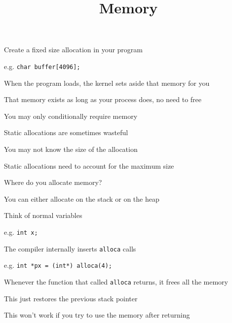 

\title{Memory}



\begin{frame}
    \titlepage
\end{frame}

\begin{slide}


    Create a fixed size allocation in your program

    \leftspace{}e.g. \texttt{char buffer[4096];}
    \medskip

    When the program loads, the kernel sets aside that memory
    for you
    \medskip

    That memory exists as long as your process does, no need to free

\end{slide}

\begin{slide}


    You may only conditionally require memory

    \leftspace{}Static allocations are sometimes wasteful
    \medskip

    You may not know the size of the allocation

    \leftspace{}Static allocations need to account for the maximum size
    \medskip

    Where do you allocate memory?

    \leftspace{}You can either allocate on the stack or on the heap

\end{slide}

\begin{slide}


    Think of normal variables

    \leftspace{}e.g. \texttt{int x;}
    \medskip

    The compiler internally inserts \texttt{alloca} calls

    \leftspace{}e.g. \texttt{int *px = (int*) alloca(4);}
    \medskip

    Whenever the function that called \texttt{alloca} returns, it
    frees all the memory

    \leftspace{}This just restores the previous stack pointer
    \medskip

    This won't work if you try to use the memory after returning

\end{slide}

